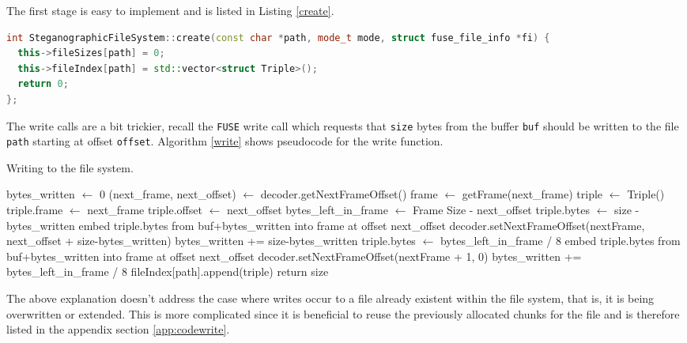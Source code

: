 \documentclass[paper=a4, fontsize=11pt,twoside]{scrartcl}
\numberwithin{table}{section}
\numberwithin{figure}{section}
\numberwithin{algorithm}{section}
\begin{document}
The first stage is easy to implement and is listed in Listing \ref{create}.

\begin{lstlisting}[language=C++, caption={The \texttt{create} function call (\texttt{fs/stegfs.cc:202}).}, frame=single, label=create,float,floatplacement=!Ht]
int SteganographicFileSystem::create(const char *path, mode_t mode, struct fuse_file_info *fi) {
  this->fileSizes[path] = 0;
  this->fileIndex[path] = std::vector<struct Triple>();
  return 0;
};
\end{lstlisting}

\noindent
The write calls are a bit trickier, recall the \texttt{FUSE} write call which requests that \texttt{size} bytes from the buffer \texttt{buf} should be written to the file \texttt{path} starting at offset \texttt{offset}. Algorithm \ref{write} shows pseudocode for the write function.\\

\begin{algorithm}[!h]
\caption{Writing to the file system.}
\label{write}
\begin{algorithmic}[1]
\State bytes\_written $\gets$ 0
	\State (next\_frame, next\_offset) $\gets$ decoder.getNextFrameOffset()
	\State frame $\gets$ getFrame(next\_frame)
	\State triple $\gets$ Triple()
	\State triple.frame $\gets$ next\_frame
	\State triple.offset $\gets$ next\_offset
	\State bytes\_left\_in\_frame $\gets$ Frame Size - next\_offset
		\State		
		\State triple.bytes $\gets$ size - bytes\_written
		\State embed triple.bytes from buf+bytes\_written into frame at offset next\_offset
		\State decoder.setNextFrameOffset(nextFrame, next\_offset + size-bytes\_written)
		\State bytes\_written += size-bytes\_written
	\Else
		\State		
		\State triple.bytes $\gets$ bytes\_left\_in\_frame / 8
		\State embed triple.bytes from buf+bytes\_written into frame at offset next\_offset
		\State decoder.setNextFrameOffset(nextFrame + 1, 0)
		\State bytes\_written += bytes\_left\_in\_frame / 8
	\EndIf
	\State fileIndex[path].append(triple)
\EndWhile
\State return size
\end{algorithmic}
\end{algorithm}

The above explanation doesn't address the case where writes occur to a file already existent within the file system, that is, it is being overwritten or extended. This is more complicated since it is beneficial to reuse the previously allocated chunks for the file and is therefore listed in the appendix section \ref{app:codewrite}.
\end{document}
